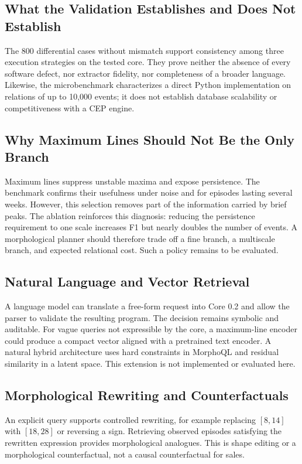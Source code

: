 \documentclass[11pt,a4paper]{article}
\begin{document}
\subsection{What the Validation Establishes and Does Not Establish}

The 800 differential cases without mismatch support consistency among three execution strategies on the tested core. They prove neither the absence of every software defect, nor extractor fidelity, nor completeness of a broader language. Likewise, the microbenchmark characterizes a direct Python implementation on relations of up to 10,000 events; it does not establish database scalability or competitiveness with a CEP engine.

\subsection{Why Maximum Lines Should Not Be the Only Branch}

Maximum lines suppress unstable maxima and expose persistence. The benchmark confirms their usefulness under noise and for episodes lasting several weeks. However, this selection removes part of the information carried by brief peaks. The ablation reinforces this diagnosis: reducing the persistence requirement to one scale increases F1 but nearly doubles the number of events. A morphological planner should therefore trade off a fine branch, a multiscale branch, and expected relational cost. Such a policy remains to be evaluated.

\subsection{Natural Language and Vector Retrieval}

A language model can translate a free-form request into Core 0.2 and allow the parser to validate the resulting program. The decision remains symbolic and auditable. For vague queries not expressible by the core, a maximum-line encoder could produce a compact vector aligned with a pretrained text encoder. A natural hybrid architecture uses hard constraints in MorphoQL and residual similarity in a latent space. This extension is not implemented or evaluated here.

\subsection{Morphological Rewriting and Counterfactuals}

An explicit query supports controlled rewriting, for example replacing $[8,14]$ with $[18,28]$ or reversing a sign. Retrieving observed episodes satisfying the rewritten expression provides morphological analogues. This is shape editing or a morphological counterfactual, not a causal counterfactual for sales.
\end{document}
